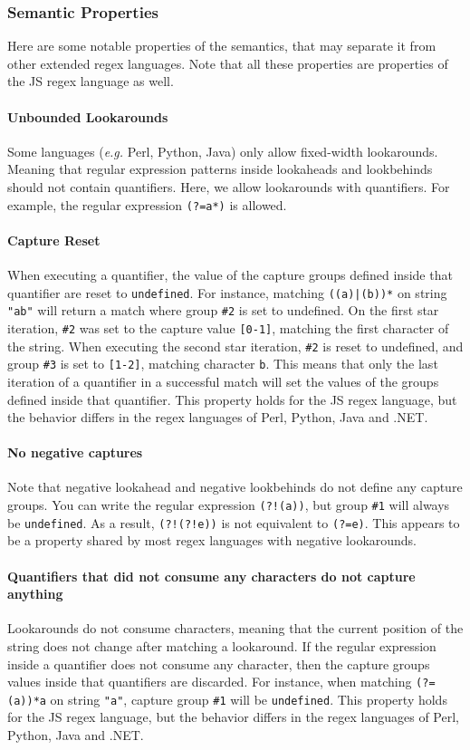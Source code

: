 \documentclass{article}
\def\regex#1{\lstinline[style=rgx]{#1}}
\def\undef{\texttt{undefined}}
\def\str#1{\texttt{"#1"}}
\def\group#1{\texttt{\##1}}
\begin{document}
\subsubsection{Semantic Properties}
Here are some notable properties of the semantics, that may separate it from other extended regex languages.
Note that all these properties are properties of the JS regex language as well.

\paragraph{Unbounded Lookarounds}
Some languages (\emph{e.g.} Perl, Python, Java) only allow fixed-width lookarounds. Meaning that regular expression patterns inside lookaheads and lookbehinds should not contain quantifiers.
Here, we allow lookarounds with quantifiers.
For example, the regular expression \regex{(?=a*)} is allowed.

\paragraph{Capture Reset}
When executing a quantifier, the value of the capture groups defined inside that quantifier are reset to \undef.
For instance, matching \regex{((a)|(b))*} on string \str{ab} will return a match where group \group{2} is set to undefined.
On the first star iteration, \group{2} was set to the capture value \texttt{[0-1]}, matching the first character of the string.
When executing the second star iteration, \group{2} is reset to undefined, and group \group{3} is set to \texttt{[1-2]}, matching character \texttt{b}.
This means that only the last iteration of a quantifier in a successful match will set the values of the groups defined inside that quantifier.
This property holds for the JS regex language, but the behavior differs in the regex languages of Perl, Python, Java and .NET.

\paragraph{No negative captures}
Note that negative lookahead and negative lookbehinds do not define any capture groups.
You can write the regular expression \regex{(?!(a))}, but group \group{1} will always be \undef.
As a result, \regex{(?!(?!e))} is not equivalent to \regex{(?=e)}.
This appears to be a property shared by most regex languages with negative lookarounds.

\paragraph{Quantifiers that did not consume any characters do not capture anything}
Lookarounds do not consume characters, meaning that the current position of the string does not change after matching a lookaround.
If the regular expression inside a quantifier does not consume any character, then the capture groups values inside that quantifiers are discarded.
For instance, when matching \regex{(?=(a))*a} on string \str{a}, capture group \group{1} will be \undef.
This property holds for the JS regex language, but the behavior differs in the regex languages of Perl, Python, Java and .NET.
\end{document}
